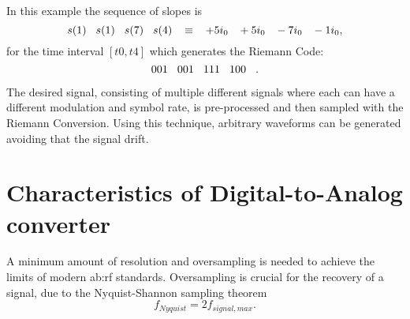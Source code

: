 In this example the sequence of slopes is
\begin{equation}
s(1)\hspace{.3cm} s(1)\hspace{.3cm} s(7)\hspace{.3cm} s(4)\hspace{.3cm} \equiv \hspace{.3cm} +5i_0\hspace{.3cm} +5i_0\hspace{.3cm} -7i_0\hspace{.3cm} -1 i_0,
 \end{equation} 
 for the time interval $[t0,t4]$ which generates the Riemann Code:
\begin{equation}
001\hspace{.3cm} 001\hspace{.3cm} 111\hspace{.3cm} 100\hspace{.3cm}.
\label{eq:RiemannCodeSineWave} 
\end{equation}

The desired signal, consisting of multiple different signals where each can have a different modulation and symbol rate, is pre-processed and then sampled with the Riemann Conversion.
Using this technique, arbitrary waveforms can be generated avoiding that the signal drift.

\section{Characteristics of Digital-to-Analog converter}
\label{ch:characteristics}
A minimum amount of resolution and oversampling is needed to achieve the limits of modern \gls{ab:rf} standards.
Oversampling is crucial for the recovery of a signal, due to the Nyquist-Shannon sampling theorem
\begin{equation}
f_{Nyquist} = 2 f_{signal,max}.
\end{equation}
\label{eq:SamplingTheorem}

